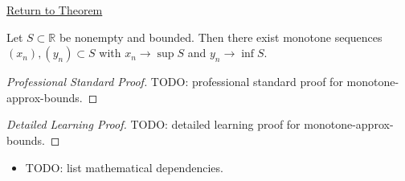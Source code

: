 \newpage
{}
\label{prf:monotone-approx-bounds}

\begin{remark*}[Return]
\hyperref[prop:monotone-approx-bounds]{Return to Theorem}
\end{remark*}

\begin{proposition*}
Let $S\subset\mathbb{R}$ be nonempty and bounded. Then there exist
monotone sequences $(x_n),(y_n)\subset S$ with
$x_n\to\sup S$ and $y_n\to\inf S$.
\end{proposition*}

\begin{proof}[Professional Standard Proof]
\LRAProofBodyStart
TODO: professional standard proof for monotone-approx-bounds.
\end{proof}

\begin{proof}[Detailed Learning Proof]
\LRAProofBodyStart
TODO: detailed learning proof for monotone-approx-bounds.
\end{proof}

\begin{remark*}
\end{remark*}

\begin{dependencies}
\begin{itemize}
  \item TODO: list mathematical dependencies.
\end{itemize}
\end{dependencies}

\clearpage
